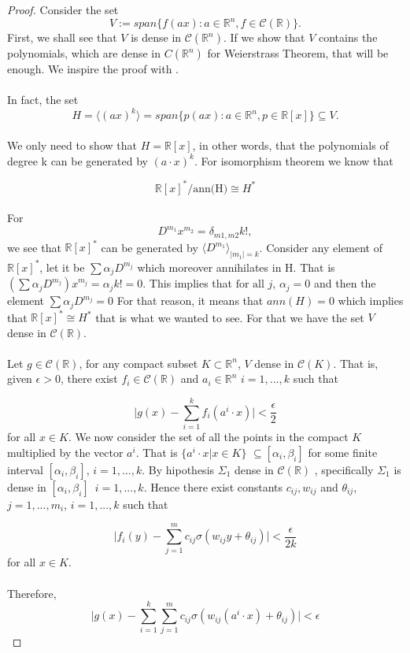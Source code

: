 \documentclass[../main.tex]{subfiles}
\begin{document}
	\begin{proof} %
			Consider the set $$V:= span\{ f(ax) : a \in \mathbb{R}^n, f \in \mathcal{C}(\mathbb{R}) \}.$$ First, we shall see that $V$ is dense in $\mathcal{C}(\mathbb{R}^n)$.  If we show that $V$ contains the polynomials, which are dense in $C(\mathbb{R}^n)$ for Weierstrass Theorem, that will be enough. We inspire the proof with \cite{chui_approximation}. \\ \\
			\noindent In fact, the set $$ H = \langle (a x)^k\rangle = span\{ p(ax) : a \in \mathbb{R}^n, p \in \mathbb{R}[x] \} \subseteq V.$$ \\
			We only need to show that $H=\mathbb{R}[x]$, in other words, that the polynomials of degree k can be generated by $(a\cdot x)^k$. For isomorphism theorem we know that
			
			 $$\mathbb{R}[x]^*/\text{ann(H)}\cong H^*$$
			 \\ 
			 For $$D^{m_1} x^{m_2}= \delta_{m1,m2}k!, $$ we see that $\mathbb{R}[x]^*$ can be generated by $\langle D^{m_1}\rangle _{|m_1|=k}$. Consider any element of $\mathbb{R}[x]^*$, let it be $\sum \alpha_j D^{m_j}$ which moreover annihilates in H. That is $(\sum \alpha_j D^{m_j} ) x^{m_j}=\alpha_j k! = 0$. This implies that $\text{for all } j,\, \alpha_j =0$ and then the element $\sum \alpha_j D^{m_j}=0$
			 For that reason, it means that $ann(H)=0$ which implies that $\mathbb{R}[x]^*\cong H^*$ that is what we wanted to see. For that we have the set $V$ dense in $\mathcal{C}(\mathbb{R})$.
			\\ \\ 
			\noindent Let $g\in \mathcal{C}(\mathbb{R}) $, for any compact subset $K \subset \mathbb{R}^n  $, $V$ dense in $\mathcal{C}(K)$. That is, given $\epsilon >0$, there exist $f_i\in  \mathcal{C}(\mathbb{R})$ and $a_i \in \mathbb{R}^n $    {\scriptsize $i=1,...,k$}  such that
			
			$$ \big| g(x)-\sum_{i=1}^k f_i(a^i \cdot x) \big| < \frac{\epsilon}{2}$$
			for all $x\in K$. We now consider the set of all the points in the compact $K$ multiplied by the vector $a^i$. That is $\{a^i \cdot x | x \in K\}$ $\subseteq[\alpha_i,\beta_i] $ for some finite interval $[\alpha_i,\beta_i]$, $i=1,...,k$. By hipothesis $\Sigma_1 $ dense in $\mathcal{C}(\mathbb{R})$ , specifically $\Sigma_1 $ is dense in $[\alpha_i,\beta_i ]$ $ \, i=1,...,k$. Hence there exist constants $c_{ij}, w_{ij}$ and $\theta_{ij}$, $j=1,...,m_i$, $i=1,...,k$ such that 
			
			$$ \big| f_i(y) - \sum_{j=1}^{m} c_{ij} \sigma(w_{ij}y+ \theta_{ij})\big| < \frac{\epsilon}{2k}$$
			for all $x\in K$. \\ \\
			Therefore, 
			$$ \big| g(x) - \sum_{i=1}^k \sum_{j=1}^m c_{ij} \sigma(w_{ij}(a^i \cdot x) + \theta_{ij})  \big| < \epsilon$$
		\end{proof}
\end{document}

